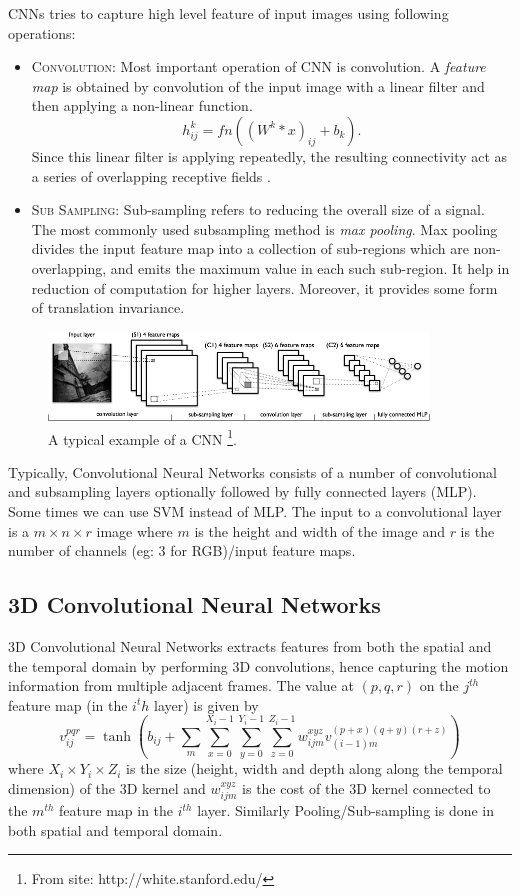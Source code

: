 \noindent CNNs tries to capture high level feature of input images using following operations:
\begin{itemize}
\item \textsc{Convolution}: Most important operation of CNN is convolution. A \textit{feature map} is obtained by convolution of the input image with a linear filter and then applying a non-linear function. 
$$h^k_{ij} = fn( (W^k * x)_{ij} + b_k ).$$
Since this linear filter is applying repeatedly, the resulting connectivity act as a series of overlapping receptive fields \cite{KarpathyCVPR14}.
\item \textsc{Sub Sampling}: Sub-sampling refers to reducing the overall size of a signal. The most commonly used subsampling method is \textit{max pooling}. Max pooling divides the input feature map into a collection of sub-regions which are non-overlapping, and emits the maximum value in each such sub-region. It help in reduction of computation for higher layers. Moreover, it provides some form of translation invariance. 
\end{itemize}

\begin{figure}[!ht]
\centering
\includegraphics[width=0.9\textwidth]{./imgs/cnn1.png} 
\caption[An example of a convolutional neural network]{A typical example of a CNN \footnote{From site: http://white.stanford.edu/}. }
\label{fig:cnn}
\end{figure}

Typically, Convolutional Neural Networks consists of a number of convolutional and subsampling layers optionally followed by fully connected layers (MLP). Some times we can use SVM instead of MLP. The input to a convolutional layer is a $m \times n \times r$ image where $m$ is the height and width of the image and $r$ is the number of channels (eg: 3 for RGB)/input feature maps. 

\subsection{3D Convolutional Neural Networks}
3D Convolutional Neural Networks extracts features from both the spatial and the temporal domain by performing 3D convolutions, hence capturing the motion information from multiple adjacent frames.\cite{ji20133d} The value at $(p, q, r)$ on the $j^{th}$ feature map (in the $i^th$ layer) is given by
$$v^{pqr}_{ij} = \tanh(b_{ij}+\sum_{m} \sum_{x=0}^{X_i-1} \sum_{y=0}^{Y_i-1} \sum_{z=0}^{Z_i-1} w^{xyz}_{ijm} v^{(p+x)(q+y)(r+z)}_{(i−1)m}) $$
where $X_i \times Y_i \times Z_i$ is the size (height, width and depth along along the temporal
dimension) of the 3D kernel and $w^{xyz}_{ijm}$ is the cost of the 3D kernel connected to the $m^{th}$ feature map in the $i^{th}$ layer. Similarly Pooling/Sub-sampling is done in both spatial and temporal domain.

